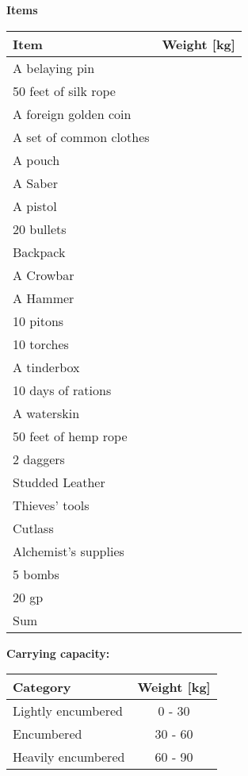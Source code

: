 \documentclass[11pt]{article}
\begin{document}
\clearpage

	\begin{center}
{\LARGE \textbf{Items}}
	\end{center}

	\begin{tabularx}{\textwidth}{X|r}
Item & Weight [kg] \\
\hline
A belaying pin 								&  			\\
50 feet of silk rope						&  			\\
A foreign golden coin 						&  			\\
A set of common clothes 					&  			\\
A pouch		 								&  			\\
A Saber		 								&  			\\
A pistol	 								&  			\\
20 bullets	 								&  			\\
Backpack 									&  			\\
A Crowbar	 								&  			\\
A Hammer	 								&  			\\
10 pitons	 								&  			\\
10 torches	 								&  			\\
A tinderbox	 								&  			\\
10 days of rations							&  			\\
A waterskin 								&  			\\
50 feet of hemp rope 						&  			\\
2 daggers 									&  			\\
Studded Leather	 							&  			\\
Thieves' tools 								&  			\\
Cutlass		 								&  			\\
Alchemist's supplies 						&  			\\
5 bombs		 								&  			\\
20 gp					 					& 			\\
\hline
Sum 										& 
	\end{tabularx}

\vspace{10mm}

\textbf{Carrying capacity:} \\

	\begin{tabular}{l|c}
Category & Weight [kg] \\
\hline
Lightly encumbered 	& 0 - 30 	\\
Encumbered 			& 30 - 60 	\\
Heavily encumbered	& 60 - 90
	\end{tabular}
\end{document}
